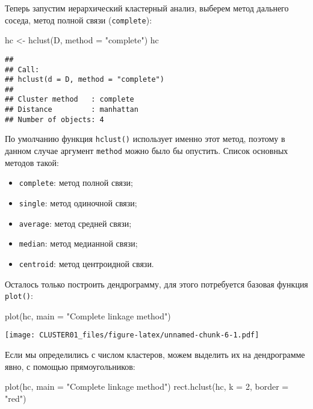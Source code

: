 \documentclass[
]{article}
\newenvironment{Shaded}{\begin{snugshade}}{\end{snugshade}}
\newcommand{\AttributeTok}[1]{\textcolor[rgb]{0.77,0.63,0.00}{#1}}
\newcommand{\DecValTok}[1]{\textcolor[rgb]{0.00,0.00,0.81}{#1}}
\newcommand{\FunctionTok}[1]{\textcolor[rgb]{0.00,0.00,0.00}{#1}}
\newcommand{\NormalTok}[1]{#1}
\newcommand{\OtherTok}[1]{\textcolor[rgb]{0.56,0.35,0.01}{#1}}
\newcommand{\StringTok}[1]{\textcolor[rgb]{0.31,0.60,0.02}{#1}}
\providecommand{\tightlist}{%
  \setlength{\itemsep}{0pt}\setlength{\parskip}{0pt}}
\begin{document}
Теперь запустим иерархический кластерный анализ, выберем метод дальнего
соседа, метод полной связи (\texttt{complete}):

\begin{Shaded}
\begin{Highlighting}[]
\NormalTok{hc }\OtherTok{\textless{}{-}} \FunctionTok{hclust}\NormalTok{(D, }\AttributeTok{method =} \StringTok{"complete"}\NormalTok{)}
\NormalTok{hc}
\end{Highlighting}
\end{Shaded}

\begin{verbatim}
## 
## Call:
## hclust(d = D, method = "complete")
## 
## Cluster method   : complete 
## Distance         : manhattan 
## Number of objects: 4
\end{verbatim}

По умолчанию функция \texttt{hclust()} использует именно этот метод,
поэтому в данном случае аргумент \texttt{method} можно было бы опустить.
Список основных методов такой:

\begin{itemize}
\tightlist
\item
  \texttt{complete}: метод полной связи;
\item
  \texttt{single}: метод одиночной связи;
\item
  \texttt{average}: метод средней связи;
\item
  \texttt{median}: метод медианной связи;
\item
  \texttt{centroid}: метод центроидной связи.
\end{itemize}

Осталось только построить дендрограмму, для этого потребуется базовая
функция \texttt{plot()}:

\begin{Shaded}
\begin{Highlighting}[]
\FunctionTok{plot}\NormalTok{(hc, }\AttributeTok{main =} \StringTok{"Complete linkage method"}\NormalTok{)}
\end{Highlighting}
\end{Shaded}

\texttt{[image: CLUSTER01\_files/figure-latex/unnamed-chunk-6-1.pdf]}

Если мы определились с числом кластеров, можем выделить их на
дендрограмме явно, с помощью прямоугольников:

\begin{Shaded}
\begin{Highlighting}[]
\FunctionTok{plot}\NormalTok{(hc, }\AttributeTok{main =} \StringTok{"Complete linkage method"}\NormalTok{)}
\FunctionTok{rect.hclust}\NormalTok{(hc, }\AttributeTok{k =} \DecValTok{2}\NormalTok{, }\AttributeTok{border =} \StringTok{"red"}\NormalTok{)}
\end{Highlighting}
\end{Shaded}
\end{document}
